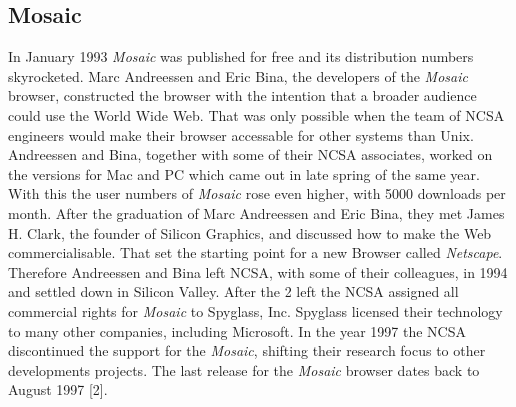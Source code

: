 \documentclass[runningheads]{llncs}
\begin{document}
		\subsection{Mosaic}
		In January 1993 \textit{Mosaic} was published for free and its distribution numbers skyrocketed. Marc Andreessen and Eric Bina, the developers of the \textit{Mosaic} browser, constructed the browser with the intention that a broader audience could use the World Wide Web. That was only possible when the team of NCSA engineers would make their browser accessable for other systems than Unix. Andreessen and Bina, together with some of their NCSA associates, worked on the versions for Mac and PC which came out in late spring of the same year. With this the user numbers of \textit{Mosaic} rose even higher, with 5000 downloads per month. After the graduation of Marc Andreessen and Eric Bina, they met James H. Clark, the founder of Silicon Graphics, and discussed how to make the Web commercialisable. That set the starting point for a new Browser called \textit{Netscape}. Therefore Andreessen and Bina left NCSA, with some of their colleagues, in 1994 and settled down in Silicon Valley. After the 2 left the NCSA assigned all commercial rights for \textit{Mosaic} to Spyglass, Inc. Spyglass licensed their technology to many other companies, including Microsoft. In the year 1997 the NCSA discontinued the support for the \textit{Mosaic}, shifting their research focus to other developments projects. The last release for the \textit{Mosaic} browser dates back to August 1997 [2].
\end{document}
